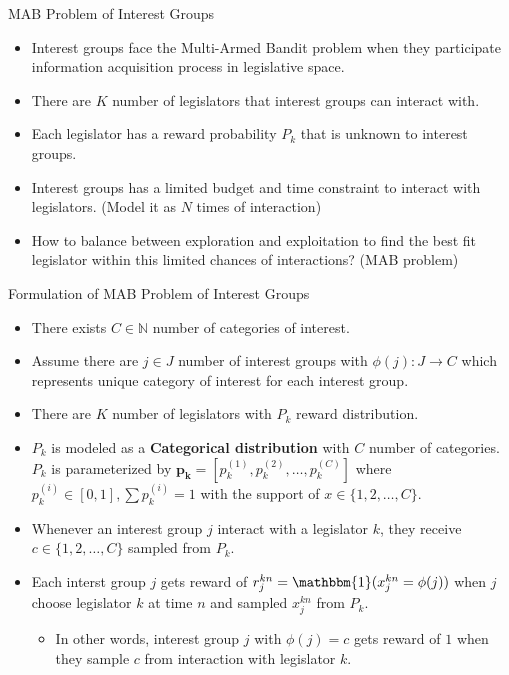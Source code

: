 \documentclass{beamer}
\begin{document}
	\begin{frame}{MAB Problem of Interest Groups}
		\begin{itemize}
			\item Interest groups face the Multi-Armed Bandit problem when they participate information acquisition process in legislative space.
			\item There are $K$ number of legislators that interest groups can interact with. 
			\item Each legislator has a reward probability $P_k$ that is unknown to interest groups.
			\item Interest groups has a limited budget and time constraint to interact with legislators. (Model it as $N$ times of interaction)
			\item How to balance between exploration and exploitation to find the best fit legislator within this limited chances of interactions? (MAB problem)
		\end{itemize}
	\end{frame}

	\begin{frame}{Formulation of MAB Problem of Interest Groups} 
		\begin{itemize}
			\item There exists $C \in \mathbb{N}$ number of categories of interest.
			\item Assume there are $j \in J$ number of interest groups with $\phi(j): J \rightarrow C$ which represents unique category of interest for each interest group.
			\item There are $K$ number of legislators with $P_k$ reward distribution.
			\item $P_k$ is modeled as a \textbf{Categorical distribution} with $C$ number of categories. $P_k$ is parameterized by $\mathbf{p_k} = [p_k^{(1)}, p_k^{(2)}, \hdots, p_k^{(C)}]$ where $p_k^{(i)} \in [0,1], \sum{p_k^{(i)}}=1$ with the support of $x \in \{1,2,\hdots,C\}$.  
			\item Whenever an interest group $j$ interact with a legislator $k$, they receive $c \in \{1, 2, \hdots, C\}$ sampled from $P_k$.
			\item  Each interst group $j$ gets reward of $r_j^{kn} = \mathbbm{1}(x_j^{kn} = \phi(j))$ when $j$ choose legislator $k$ at time $n$ and sampled $x_j^{kn}$ from $P_k$. 
			\begin{itemize}
				\item In other words, interest group $j$ with $\phi(j) = c$ gets reward of $1$ when they sample $c$ from interaction with legislator $k$.
			\end{itemize}
		\end{itemize}
	\end{frame}
\end{document}
